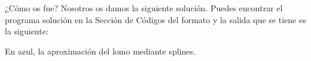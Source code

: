 ¿Cómo os fue? Nosotros os damos la siguiente solución. Puedes encontrar el programa solución en la Sección de Códigos del formato y la salida que se tiene es la siguiente:
\begin{mybox}

   \begin{center}\scalebox{0.64}{}\end{center}
En azul, la aproximación del lomo mediante splines.
    
\end{mybox}





\newpage




